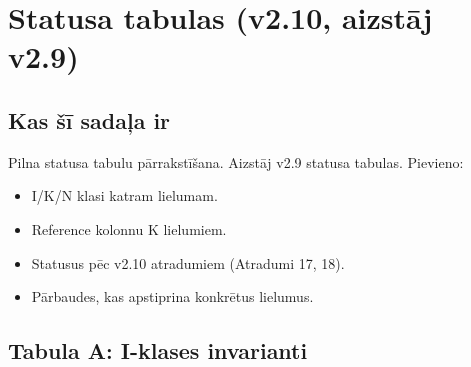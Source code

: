 \documentclass[12pt,a4paper]{article}
\begin{document}
\newpage

\section{Statusa tabulas (v2.10, aizstāj v2.9)}
\label{sec:statusa-tabulas-v210}

\subsection*{Kas šī sadaļa ir}

Pilna statusa tabulu pārrakstīšana. Aizstāj v2.9 statusa tabulas. Pievieno:
\begin{itemize}
    \item I/K/N klasi katram lielumam.
    \item Reference kolonnu K lielumiem.
    \item Statusus pēc v2.10 atradumiem (Atradumi 17, 18).
    \item Pārbaudes, kas apstiprina konkrētus lielumus.
\end{itemize}

\subsection*{Tabula A: I-klases invarianti}
\end{document}
